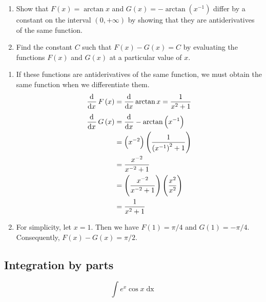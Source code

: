 \documentclass[a4paper, titlepage]{article}
\begin{document}
\begin{Exercise}

\begin{enumerate}[label=(\alph*)]
\item Show that \(F \left( x \right) = \arctan x\) and
      \(G \left( x \right) = -\arctan \left( x^{-1} \right)\) differ by a
      constant on the interval \((0, +\infty)\) by showing that they are
      antiderivatives of the same function.

\item Find the constant \(C\) such that
      \(F \left( x \right) - G \left( x \right) = C\) by evaluating the
      functions \(F \left( x \right)\) and \(G \left( x \right)\) at a
      particular value of \(x\).

\end{enumerate}
\cite{anton-bivens-davis}
\end{Exercise}

\begin{Answer}
\begin{enumerate}[label=(\alph*)]
\item If these functions are antiderivatives of the same function, we must obtain the same
      function when we differentiate them.
      \[\dod{}{x} F \left( x \right)
      = \dod{}{x} \arctan x
      = \frac{1}{x^2 + 1}\]
      \begin{align*}
      \dod{}{x} G \left( x \right)
      &= \dod{}{x} - \arctan \left( x^{-1} \right) \\
      &= \left(x^{-2}\right) \left(\frac{1}{\left(x^{-1}\right)^2 + 1}\right) \\
      &= \frac{x^{-2}}{x^{-2} + 1} \\
      &= \left(\frac{x^{-2}}{x^{-2} + 1}\right) \left(\frac{x^2}{x^2}\right) \\
      &= \frac{1}{x^{2} + 1}
      \end{align*}
\item For simplicity, let \(x = 1\). Then we have \(F \left(1\right) = \pi / 4\)
and \(G \left(1\right) = - \pi / 4\). Consequently,
\(F \left( x \right) - G \left( x \right) = \pi / 2\).
\end{enumerate}
\end{Answer}

\subsection{Integration by parts}

\begin{Exercise}
\[\int e^x \cos x \mathop{dx}\]
\end{Exercise}
\end{document}
